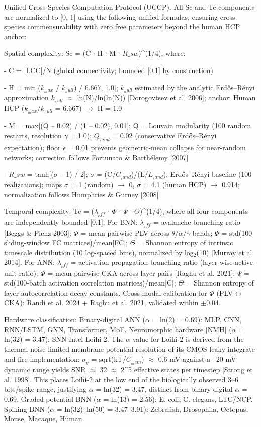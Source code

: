 \documentclass[a4paper,12pt]{article}
\begin{document}
Unified Cross-Species Computation Protocol (UCCP). All Sc and Tc components are normalized to [0, 1] using the following unified formulas, ensuring cross-species commensurability with zero free parameters beyond the human HCP anchor:


Spatial complexity: Sc = (C $\cdot$ H $\cdot$ M $\cdot$ $R\_{sw}$)^(1/4), where:


- C = |LCC|/N (global connectivity; bounded [0,1] by construction)


- H = min[($k_{_max}$ / $k_{_null}$) / 6.667, 1.0]; $k_{_null}$ estimated by the analytic Erd\H{o}s--R\'{e}nyi approximation $k_{_null}$ $\approx$ ln(N)/ln(ln(N)) [Dorogovtsev et al. 2006]; anchor: Human HCP ($k_{_max}$/$k_{_null}$ = 6.667) $\rightarrow$ H = 1.0


- M = max[(Q -- 0.02) / (1 -- 0.02), 0.01]; Q = Louvain modularity (100 random restarts, resolution $\gamma$ = 1.0); $Q_{_rand}$ = 0.02 (conservative Erd\H{o}s--R\'{e}nyi expectation); floor $\epsilon$ = 0.01 prevents geometric-mean collapse for near-random networks; correction follows Fortunato \& Barth\'{e}lemy [2007]


- $R\_{sw}$ = tanh[($\sigma$ -- 1) / 2]; $\sigma$ = (C/$C_{_rand}$)/(L/$L_{_rand}$), Erd\H{o}s--R\'{e}nyi baseline (100 realizations); maps $\sigma$ = 1 (random) $\rightarrow$ 0, $\sigma$ = 4.1 (human HCP) $\rightarrow$ 0.914; normalization follows Humphries \& Gurney [2008]


Temporal complexity: Tc = ($\lambda_{_eff}$ $\cdot$ $\Phi$ $\cdot$ $\Psi$ $\cdot$ $\Theta$)^(1/4), where all four components are independently bounded [0,1]. For BNN: $\lambda_{_eff}$ = avalanche branching ratio [Beggs \& Plenz 2003]; $\Phi$ = mean pairwise PLV across $\theta$/$\alpha$/$\gamma$ bands; $\Psi$ = std(100 sliding-window FC matrices)/mean|FC|; $\Theta$ = Shannon entropy of intrinsic timescale distribution (10 log-spaced bins), normalized by log$_2$(10) [Murray et al. 2014]. For ANN: $\lambda_{_eff}$ = activation propagation branching ratio (layer-wise active-unit ratio); $\Phi$ = mean pairwise CKA across layer pairs [Raghu et al. 2021]; $\Psi$ = std(100-batch activation correlation matrices)/mean|C|; $\Theta$ = Shannon entropy of layer autocorrelation decay constants. Cross-modal calibration for $\Phi$ (PLV$\leftrightarrow$CKA): Randi et al. 2024 + Raghu et al. 2021, validated within $\pm$0.04.


Hardware classification: Binary-digital ANN ($\alpha$ = ln(2) = 0.69): MLP, CNN, RNN/LSTM, GNN, Transformer, MoE. Neuromorphic hardware [NMH\dag] ($\alpha$ = ln(32) = 3.47): SNN Intel Loihi-2. The $\alpha$ value for Loihi-2 is derived from the thermal-noise-limited membrane potential resolution of its CMOS leaky integrate-and-fire implementation: $\sigma_{_V}$ = sqrt(kT/$C_{_mem}$) $\approx$ 0.6 mV against a ~20 mV dynamic range yields SNR $\approx$ 32 $\approx$ 2^5 effective states per timestep [Strong et al. 1998]. This places Loihi-2 at the low end of the biologically observed 3--6 bits/spike range, justifying $\alpha$ = ln(32) = 3.47, distinct from binary-digital $\alpha$ = 0.69. Graded-potential BNN ($\alpha$ = ln(13) = 2.56): E. coli, C. elegans, LTC/NCP. Spiking BNN ($\alpha$ = ln(32)--ln(50) = 3.47--3.91): Zebrafish, Drosophila, Octopus, Mouse, Macaque, Human.
\end{document}
